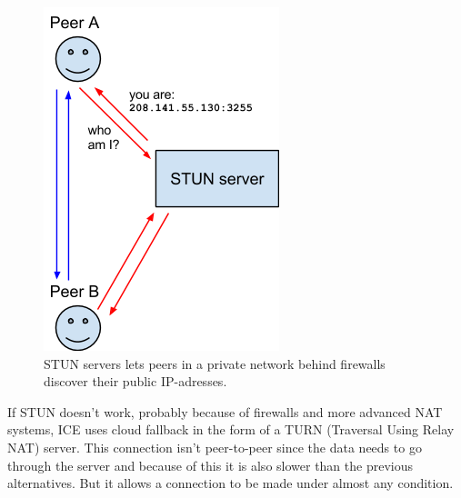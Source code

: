 \begin{figure}[htp]
\centering
\includegraphics[width=\textwidth,height=0.2\paperheight,keepaspectratio
]{figures/webrtc-stun}
\caption{STUN servers lets peers in a private network behind firewalls discover their public IP-adresses\cite{WebRTCArchitecture:2014:Online}.}
\label{fig:WebRTC - STUN}
\end{figure}

If STUN doesn't work, probably because of firewalls and more advanced NAT systems, ICE uses cloud fallback in the form of a TURN (Traversal Using Relay NAT) server. This connection isn't peer-to-peer since the data needs to go through the server and because of this it is also slower than the previous alternatives. But it allows a connection to be made under almost any condition.

